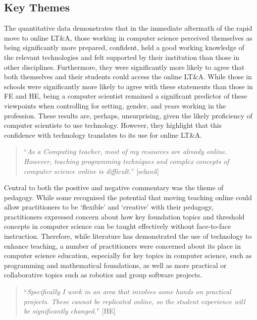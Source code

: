 \documentclass[sigconf]{acmart}
\begin{document}
\subsection{Key Themes}

The quantitative data demonstrates that in the immediate aftermath of
the rapid move to online LT\&A, those working in computer science
perceived themselves as being significantly more prepared, confident,
held a good working knowledge of the relevant technologies and felt
supported by their institution than those in other
disciplines. Furthermore, they were significantly more likely to agree
that both themselves and their students could access the online
LT\&A. While those in schools were significantly more likely to agree
with these statements than those in FE and HE, being a computer
scientist remained a significant predictor of these viewpoints when
controlling for setting, gender, and years working in the profession.
These results are, perhaps, unsurprising, given the likely proficiency of
computer scientists to use technology. However, they highlight that
this confidence with technology translates to its use for online LT\&A.

\begin{quotation}
``{\emph{As a Computing teacher, most of my resources are already
online. However, teaching programming techniques and complex concepts
of computer science online is difficult.}}'' [school]
\end{quotation}

Central to both the positive and negative commentary was the theme of
pedagogy. While some recognised the potential that moving teaching
online could allow practitioners to be `flexible' and `creative' with
their pedagogy, practitioners expressed concern about how key
foundation topics and threshold concepts in computer science can be
taught effectively without face-to-face instruction. Therefore, while
literature has demonstrated the use of technology to enhance teaching,
a number of practitioners were concerned about its place in computer
science education, especially for key topics in computer science, such
as programming and mathematical foundations, as well as more practical
or collaborative topics such as robotics and group software projects.

\begin{quotation}
``{\emph{Specifically I work in an area that involves some hands on practical
projects. These cannot be replicated online, so the student experience
will be significantly changed.}}'' [HE]
\end{quotation}
\end{document}
